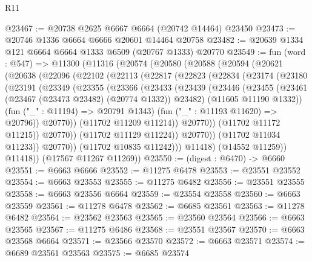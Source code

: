 \begin{lexlean}{R11}
\begin{coremodule}
{{{{{{{{{{{{{{{{{{{{{{{{{{{{{{{{{{{{{{{{{{{{{{{{{{{{{{{{{{{{{{{{{{{{{{{{{{{{{{{{{{@23467 := @20738 @2625 @6667 @6664 (@20742 @14464) @23450
@23473 := @20746 @1336 @6664 @6666 @20601 @14464 @20758
@23482 := @20639 @1334 @121 @6664 @6664 @1333 @6509 (@20767 @1333) @20770
@23549 := fun (word : @547) =>
  @11300
    (@11316
      (@20574
        (@20580
          (@20588
            (@20594
              (@20621
                (@20638
                  (@22096
                    (@22102
                      (@22113
                        (@22817
                          (@22823
                            (@22834
                              (@23174
                                (@23180
                                  (@23191
                                    (@23349
                                      (@23355
                                        (@23366
                                          (@23433
                                            (@23439
                                              (@23446
                                                (@23455
                                                  (@23461
                                                    (@23467 (@23473 @23482) (@20774 @1332))
                                                    @23482)
                                                  (@11605 @11190 @1332))
                                                (fun ("_" : @11194) => @20791 @1343)
                                                (fun ("_" : @11193 @11620) => @20796))
                                              @20770))
                                          (@11702 @11209 @11214))
                                        @20770))
                                    (@11702 @11172 @11215))
                                  @20770))
                              (@11702 @11129 @11224))
                            @20770))
                        (@11702 @11034 @11233))
                      @20770))
                  (@11702 @10835 @11242)))
              @11418)
            (@14552 @11259))
          @11418))
      (@17567 @11267 @11269))
@23550 := (digest : @6470) -> @6660
@23551 := @6663 @6666
@23552 := @11275 @6478
@23553 := @23551 @23552
@23554 := @6663 @23553
@23555 := @11275 @6482
@23556 := @23551 @23555
@23558 := @6663 @23556 @6664
@23559 := @23554 @23558
@23560 := @6663 @23559
@23561 := @11278 @6478
@23562 := @6685 @23561
@23563 := @11278 @6482
@23564 := @23562 @23563
@23565 := @23560 @23564
@23566 := @6663 @23565
@23567 := @11275 @6486
@23568 := @23551 @23567
@23570 := @6663 @23568 @6664
@23571 := @23566 @23570
@23572 := @6663 @23571
@23574 := @6689 @23561 @23563
@23575 := @6685 @23574
}}}}}}}}}}}}}}}}}}}}}}}}}}}}}}}}}}}}}}}}}}}}}}}}}}}}}}}}}}}}}}}}}}}}}}}}}}}}}}}}}}
\end{coremodule}
\end{lexlean}

